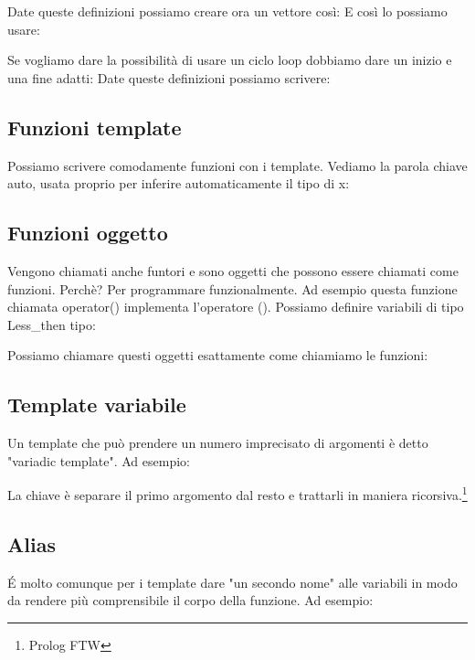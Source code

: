 \documentclass[11pt,a4paper]{book}
\begin{document}
Date queste definizioni possiamo creare ora un vettore così:
\label{code: 045}
E così lo possiamo usare:
\label{code: 046}

Se vogliamo dare la possibilità di usare un ciclo loop dobbiamo dare un inizio e una fine adatti:
\label{code: 047}
Date queste definizioni possiamo scrivere:
\label{code: 048}

\subsection{Funzioni template}
Possiamo scrivere comodamente funzioni con i template. Vediamo la parola chiave auto, usata proprio per inferire automaticamente il tipo di x:
\label{code: 049}

\subsection{Funzioni oggetto}
Vengono chiamati anche funtori e sono oggetti che possono essere chiamati come funzioni. Perchè? Per programmare funzionalmente.
\label{code: 050}
Ad esempio questa funzione chiamata operator() implementa l'operatore (). Possiamo definire variabili di tipo Less\_then tipo:
\label{code: 051}

Possiamo chiamare questi oggetti esattamente come chiamiamo le funzioni:
\label{code: 052}

\subsection{Template variabile}
Un template che può prendere un numero imprecisato di argomenti è detto "variadic template". Ad esempio:
\label{code: 053}

La chiave è separare il primo argomento dal resto e trattarli in maniera ricorsiva.\footnote{Prolog FTW}

\subsection{Alias}
É molto comunque per i template dare "un secondo nome" alle variabili in modo da rendere più comprensibile il corpo della funzione. Ad esempio:
\label{code: 054}
\end{document}
